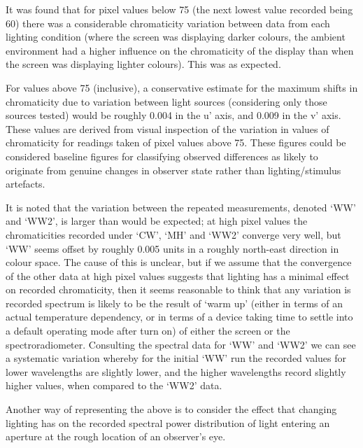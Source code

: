 It was found that for pixel values below 75 (the next lowest value recorded being 60) there was a considerable chromaticity variation between data from each lighting condition (where the screen was displaying darker colours, the ambient environment had a higher influence on the chromaticity of the display than when the screen was displaying lighter colours). This was as expected.



For values above 75 (inclusive), a conservative estimate for the maximum shifts in chromaticity due to variation between light sources (considering only those sources tested) would be roughly 0.004 in the u' axis, and 0.009 in the v' axis. These values are derived from visual inspection of the variation in values of chromaticity for readings taken of pixel values above 75. These figures could be considered baseline figures for classifying observed differences as likely to originate from genuine changes in observer state rather than lighting/stimulus artefacts.

It is noted that the variation between the repeated measurements, denoted `WW' and `WW2', is larger than would be expected; at high pixel values the chromaticities recorded under `CW', `MH' and `WW2' converge very well, but `WW' seems offset by roughly 0.005 units in a roughly north-east direction in colour space. The cause of this is unclear, but if we assume that the convergence of the other data at high pixel values suggests that lighting has a minimal effect on recorded chromaticity, then it seems reasonable to think that any variation is recorded spectrum is likely to be the result of `warm up' (either in terms of an actual temperature dependency, or in terms of a device taking time to settle into a default operating mode after turn on) of either the screen or the spectroradiometer. Consulting the spectral data for `WW' and `WW2' we can see a systematic variation whereby for the initial `WW' run the recorded values for lower wavelengths are slightly lower, and the higher wavelengths record slightly higher values, when compared to the `WW2' data.


Another way of representing the above is to consider the effect that changing lighting has on the recorded spectral power distribution of light entering an aperture at the rough location of an observer's eye.

